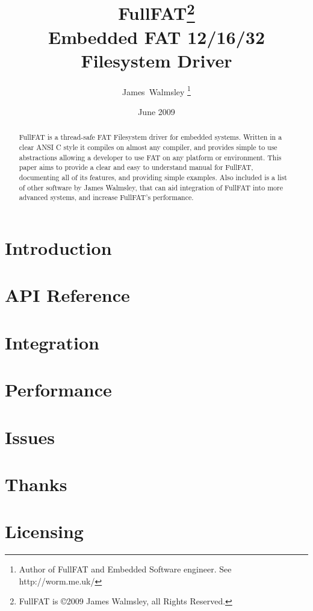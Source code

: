 \documentclass[final,a4paper,12pt]{article}
\begin{document}
\title{\Huge{FullFAT\footnote {FullFAT is \copyright  2009 James Walmsley, all Rights Reserved.}}\\\Large{Embedded FAT 12/16/32 Filesystem Driver}}
\author{James~Walmsley \thanks{Author of FullFAT and Embedded Software engineer. See http://worm.me.uk/}}
\date{June 2009}
\maketitle

\begin {abstract} 
FullFAT is a thread-safe FAT Filesystem driver for embedded systems. Written in a clear ANSI C style it compiles on almost any compiler, and provides simple to use abstractions allowing a developer to use FAT on any platform or environment. This paper aims to provide a clear and easy to understand manual for FullFAT, documenting all of its features, and providing simple examples. Also included is a list of other software by James Walmsley, that can aid integration of FullFAT into more advanced systems, and increase FullFAT's performance.

\end {abstract}

\newpage
\tableofcontents
\newpage
\section{Introduction}


\newpage
\section{API Reference}


\newpage
\section{Integration}


\newpage
\section{Performance}

\newpage
\section{Issues}

\newpage
\section{Thanks}


\newpage
\section{Licensing}

\end{document}
